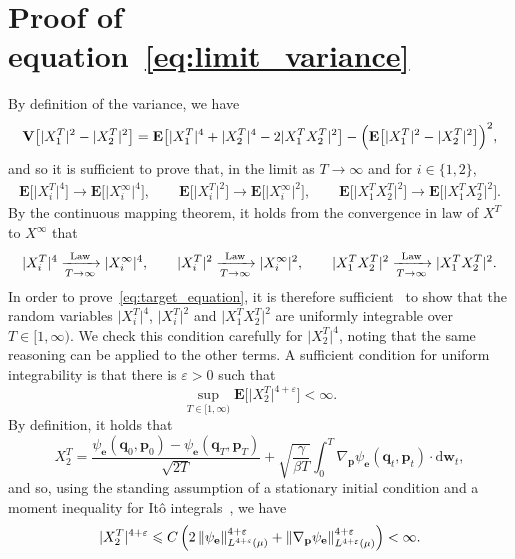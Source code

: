 \documentclass[11pt,a4paper]{article}
\newcommand{\expect}[0]{\mathbf{E}}
\newcommand{\var}[0]{\mathbf{V}}
\newcommand{\grad}{\nabla}
\newcommand{\vect}[1]{\boldsymbol{\mathbf #1}}
\renewcommand{\d}{\mathrm d}
\theoremstyle{plain}
\numberwithin{equation}{section}
\renewcommand{\leq}{\leqslant}
\begin{document}
\section{Proof of \texorpdfstring{equation~\eqref{eq:limit_variance}}{the limit of the variance}}%
\label{sec:proof_of_equation_variance}
By definition of the variance,
we have
\[
    \var \bigl[ \lvert X^T_1 \rvert^2 - \lvert X^T_2 \rvert^2 \bigr]
    = \expect \bigl[ \lvert X^T_1 \rvert^4 + \lvert X^T_2 \rvert^4 - 2 \lvert X^T_1 X^T_2 \rvert^2 \bigr]
    - \Bigl( \expect \bigl[ \lvert X^T_1 \rvert^2 - \lvert X^T_2 \rvert^2 \bigr] \Bigr)^2,
\]
and so it is sufficient to prove that,
in the limit as $T \to \infty$ and for $i \in \{1, 2\}$,
\begin{align}
    \label{eq:target_equation}
    \expect \bigl[ \lvert X^T_i \rvert^4 \bigr] 
    \to \expect \bigl[ \lvert X^{\infty}_i \rvert^4 \bigr],
    \qquad  
    \expect \bigl[ \lvert X^T_i \rvert^2 \bigr] 
    \to \expect \bigl[ \lvert X^{\infty}_i \rvert^2 \bigr],
    \qquad
    \expect \bigl[ \lvert X^T_1 X^T_2 \rvert^2 \bigr]
    \to \expect \bigl[ \lvert X^T_1 X^T_2 \rvert^2 \bigr].
\end{align}
By the continuous mapping theorem, 
it holds from the convergence in law of $X^{T}$ to $X^{\infty}$ that 
\[
     \lvert X^T_i \rvert^4  
    \xrightarrow[T \to \infty]{\rm Law} 
    \lvert X^{\infty}_i \rvert^4 ,
    \qquad  
     \lvert X^T_i \rvert^2  
    \xrightarrow[T \to \infty]{\rm Law} 
    \lvert X^{\infty}_i \rvert^2 ,
    \qquad
     \lvert X^T_1 X^T_2 \rvert^2 
    \xrightarrow[T \to \infty]{\rm Law} 
    \lvert X^T_1 X^T_2 \rvert^2 .
\]
In order to prove~\eqref{eq:target_equation},
it is therefore sufficient~\cite[Theorem 5.4]{MR0233396}
to show that the random variables $\lvert X^T_i \rvert^4$, $\lvert X^T_i \rvert^2$ and $\lvert X^T_1 X^T_2 \rvert^2$
are uniformly integrable over $T \in [1, \infty)$.
We check this condition carefully for $\lvert X^T_2 \rvert^4$,
noting that the same reasoning can be applied to the other terms.
A sufficient condition for uniform integrability is that there is $\varepsilon > 0$ such that
\[
    \sup_{T \in [1, \infty)} \expect \bigl[ \lvert X^T_2 \rvert^{4+\varepsilon} \bigr] < \infty.
\]
By definition, 
it holds that
\[
    X^T_2 = 
    \frac{\psi_{\vect e}(\vect q_0, \vect p_0) - \psi_{\vect e}(\vect q_T, \vect p_T)}{\sqrt{2T}}
    + \sqrt{\frac{\gamma}{\beta T}} \int_{0}^{T} \grad_{\vect p} \psi_{\vect e} (\vect q_t, \vect p_t) \cdot \d \vect w_t,
\]
and so, using the standing assumption of a stationary initial condition
and a moment inequality for It\^o integrals~\cite[Theorem 7.1]{MR2380366},
we have
\[
    \lvert X^T_2 \rvert^{4+ \varepsilon} \leq  
    C \left( 2\norm{\psi_{\vect e}}[L^{4+\varepsilon}(\mu)]^{4 + \varepsilon} + 
        \norm{\grad_{\vect p} \psi_{\vect e}}[L^{4+\varepsilon}(\mu)]^{4+\varepsilon}
        \right) < \infty.
\]
\end{document}

